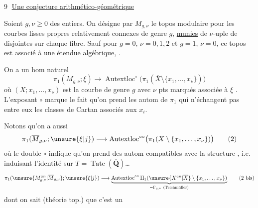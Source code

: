 \textcircled{9} \uline{Une conjecture arithmético-géométrique}

Soient $g,\nu\geq0$ des entiers. On désigne par $M_{g,\nu}$ le topos modulaire  pour les courbes  lisses propres relativement connexes de genre $g$, \uline{munies} de  $\nu$-uple de  disjointes sur chaque fibre. Sauf pour $g=0$, $\nu=0,1,2$ et $g=1$, $\nu=0$, ce topos est associé à une étendue algébrique, .

On a un hom naturel 
\[
\pi_1(M_{g,\nu};\xi)\longrightarrow\operatorname{Autextloc}^{\circ}\bigl(\pi_1(\overline X\setminus\{x_1,\ldots,x_\nu\})\bigr)\tag{1}
\]
où $(X;x_1,\ldots,x_\nu)$ est la courbe  de genre $g$ avec $\nu$ pts marqués associée à $\xi$ .  L'exposant $\circ$ marque le fait qu'on prend les autom de $\pi_1$ qui n'échangent pas entre eux les classes de Cartan associés aux $x_i$.

Notons qu'on a aussi
\[
\pi_1(\overline M_{g,\nu};\unsure{\xi|j})\longrightarrow\operatorname{Autextloc}^{\circ\circ}\bigl(\pi_1(X\setminus\{x_1,\ldots,x_\nu\})\bigr)\tag{2}
\]
où le double $\circ$ indique qu'on prend des autom  compatibles avec la structure , i.e. induisant l'identité sur $T=\operatorname{Tate}(\overline{\mathbf Q})$\ldots
{}
\[
\pi_1(\unsure{M_{g,\nu}^{an}|\overline M_{g,\nu}};\unsure{\xi|j})\longrightarrow
\underbrace{\operatorname{Autextloc}^{\circ\circ}\Pi_1(\unsure{X^{an}|\overline X}\setminus\{x_1,\ldots,x_\nu\})}_{=\Gamma_{g,\nu}\ (\text{Teichmüller})}\tag{2 bis}
\]
dont on sait (théorie top.) que c'est un
